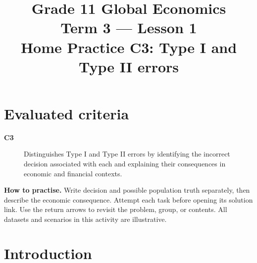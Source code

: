 \makeatletter
{}
\makeatother


\newcommand{\Pop}[1]{\HighlightStroke{GTenHLParameter}{#1}}
\newcommand{\Obs}[1]{\HighlightStroke{GTenHLValue}{#1}}
\newcommand{\Design}[1]{\HighlightStroke{GTenHLThird}{#1}}
\newcommand{\Result}[1]{\HighlightStroke{GTenHLOutcome}{#1}}

\title{Grade 11 Global Economics\\Term 3 --- Lesson 1\\Home Practice C3: Type I and Type II errors}
\author{}\date{}

\maketitle
\setcounter{tocdepth}{1}
\setcounter{secnumdepth}{2}
\label{toc}
\tableofcontents
\section*{Evaluated criteria}
\begin{description}
\item[\textbf{C3}] Distinguishes Type I and Type II errors by identifying the incorrect decision associated with each and explaining their consequences in economic and financial contexts.
\end{description}
\textbf{How to practise.} Write decision and possible population truth separately, then describe the economic consequence. Attempt each task before opening its solution link. Use the return arrows to revisit the problem, group, or contents. All datasets and scenarios in this activity are illustrative.
\clearpage
\section{Introduction}\label{sec:introduction}
